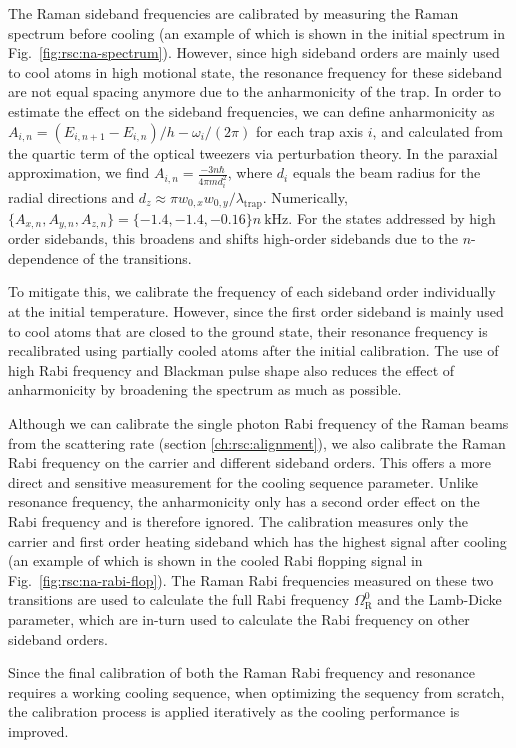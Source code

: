 The Raman sideband frequencies are calibrated by measuring the Raman spectrum before cooling
(an example of which is shown in the initial spectrum in Fig.~\ref{fig:rsc:na-spectrum}).
However, since high sideband orders are mainly used to cool atoms in high motional state,
the resonance frequency for these sideband are not equal spacing anymore due to
the anharmonicity of the trap.
In order to estimate the effect on the sideband frequencies,
we can define anharmonicity as $A_{i,n}=(E_{i,n+1}-E_{i,n})/h - \omega_i/(2\pi)$
for each trap axis $i$, and calculated from the quartic term
of the optical tweezers via perturbation theory.
In the paraxial approximation, we find $A_{i,n}=\frac{-3n\hbar}{4\pi m d_i^2}$,
where $d_i$ equals the beam radius for the radial directions and
$d_z\approx\pi w_{0,x}w_{0,y}/\lambda_{\textrm{trap}}$.
Numerically, $\{A_{x,n},A_{y,n},A_{z,n}\}=\{-1.4, -1.4, -0.16\}n~\mathrm{kHz}$.
For the states addressed by high order sidebands,
this broadens and shifts high-order sidebands
due to the $n$-dependence of the transitions.

To mitigate this, we calibrate the frequency of each sideband order individually
at the initial temperature. However, since the first order sideband is mainly used to cool atoms
that are closed to the ground state,
their resonance frequency  is recalibrated using partially cooled atoms after the initial calibration.
The use of high Rabi frequency and Blackman pulse shape also reduces the effect
of anharmonicity by broadening the spectrum as much as possible.

Although we can calibrate the single photon Rabi frequency of the Raman beams from the scattering rate
(section \ref{ch:rsc:alignment}), we also calibrate the Raman Rabi frequency on the carrier and
different sideband orders.
This offers a more direct and sensitive measurement for the cooling sequence parameter.
Unlike resonance frequency, the anharmonicity only has a second order effect on the Rabi frequency
and is therefore ignored. The calibration measures
only the carrier and first order heating sideband which has the highest signal after cooling
(an example of which is shown in the cooled Rabi flopping signal in Fig.~\ref{fig:rsc:na-rabi-flop}).
The Raman Rabi frequencies measured on these two transitions are used to calculate
the full Rabi frequency $\Omega_{\mathrm{R}}^0$ and the Lamb-Dicke parameter,
which are in-turn used to calculate the Rabi frequency on other sideband orders.

Since the final calibration of both the Raman Rabi frequency and resonance requires a working
cooling sequence, when optimizing the sequency from scratch,
the calibration process is applied iteratively as the cooling performance is improved.

